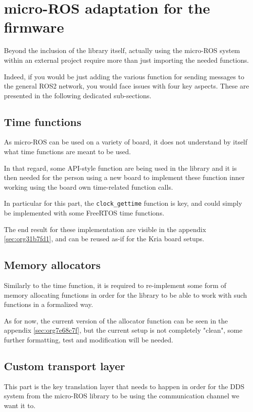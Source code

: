 \documentclass[10pt]{article}
\begin{document}
\section{micro-ROS adaptation for the firmware}
\label{sec:org8bb5c53}
Beyond the inclusion of the library itself, actually using the micro-ROS system
within an external project require more than just importing the needed
functions.

Indeed, if you would be just adding the various function for sending messages to
the general ROS2 network, you would face issues with four key aspects.
These are presented in the following dedicated sub-sections.

\subsection{Time functions}
\label{sec:org569bf72}
As micro-ROS can be used on a variety of board, it does not understand by itself
what time functions are meant to be used.

In that regard, some API-style function are being
used in the library and it is then needed for the person using a new board
to implement these function inner working using the board own time-related
function calls.

In particular for this part, the \texttt{clock\_gettime} function is key, and could
simply be implemented with some FreeRTOS time functions.

The end result for these implementation are visible in the appendix \ref{sec:org31b7fd1},
and can be reused as-if for the Kria board setups.

\subsection{Memory allocators}
\label{sec:orgdd6d041}
Similarly to the time function, it is required to re-implement some form of memory allocating
functions in order for the library to be able to work with such functions in a formalized way.

As for now, the current version of the allocator function can be seen in the
appendix \ref{sec:org7e68c7f}, but the current setup is not
completely "clean", some further formatting, test and modification will be needed.

\subsection{Custom transport layer}
\label{sec:org4e51ff9}
This part is the key translation layer that needs to happen in order for the
DDS system from the micro-ROS library to be using the communication channel we
want it to.
\end{document}
